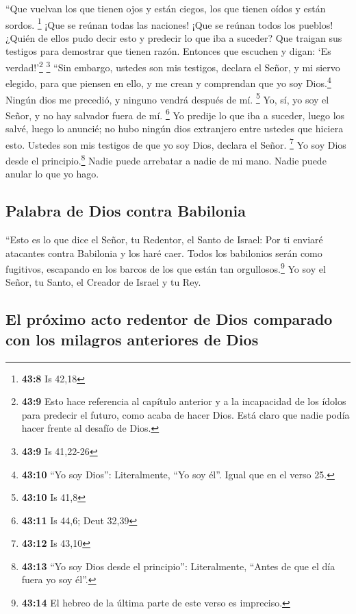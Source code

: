  ``Que vuelvan los que tienen ojos y están ciegos, los que
tienen oídos y están sordos. \footnote{\textbf{43:8} Is 42,18}
 ¡Que se reúnan todas las naciones! ¡Que se reúnan todos
los pueblos! ¿Quién de ellos pudo decir esto y predecir lo que iba a
suceder? Que traigan sus testigos para demostrar que tienen razón.
Entonces que escuchen y digan: `Es verdad!'\footnote{\textbf{43:9} Esto
  hace referencia al capítulo anterior y a la incapacidad de los ídolos
  para predecir el futuro, como acaba de hacer Dios. Está claro que
  nadie podía hacer frente al desafío de Dios.} \footnote{\textbf{43:9}
  Is 41,22-26}  ``Sin embargo, ustedes son mis testigos,
declara el Señor, y mi siervo elegido, para que piensen en ello, y me
crean y comprendan que yo soy Dios.\footnote{\textbf{43:10} ``Yo soy
  Dios'': Literalmente, ``Yo soy él''. Igual que en el verso 25.} Ningún
dios me precedió, y ninguno vendrá después de mí. \footnote{\textbf{43:10}
  Is 41,8}  Yo, sí, yo soy el Señor, y no hay salvador
fuera de mí. \footnote{\textbf{43:11} Is 44,6; Deut 32,39}
 Yo predije lo que iba a suceder, luego los salvé, luego
lo anuncié; no hubo ningún dios extranjero entre ustedes que hiciera
esto. Ustedes son mis testigos de que yo soy Dios, declara el Señor.
\footnote{\textbf{43:12} Is 43,10}  Yo soy Dios desde el
principio.\footnote{\textbf{43:13} ``Yo soy Dios desde el principio'':
  Literalmente, ``Antes de que el día fuera yo soy él''.} Nadie puede
arrebatar a nadie de mi mano. Nadie puede anular lo que yo hago.

\hypertarget{palabra-de-dios-contra-babilonia}{%
\subsection{Palabra de Dios contra
Babilonia}\label{palabra-de-dios-contra-babilonia}}

 ``Esto es lo que dice el Señor, tu Redentor, el Santo de
Israel: Por ti enviaré atacantes contra Babilonia y los haré caer. Todos
los babilonios serán como fugitivos, escapando en los barcos de los que
están tan orgullosos.\footnote{\textbf{43:14} El hebreo de la última
  parte de este verso es impreciso.}  Yo soy el Señor, tu
Santo, el Creador de Israel y tu Rey.

\hypertarget{el-pruxf3ximo-acto-redentor-de-dios-comparado-con-los-milagros-anteriores-de-dios}{%
\subsection{El próximo acto redentor de Dios comparado con los milagros
anteriores de
Dios}\label{el-pruxf3ximo-acto-redentor-de-dios-comparado-con-los-milagros-anteriores-de-dios}}

